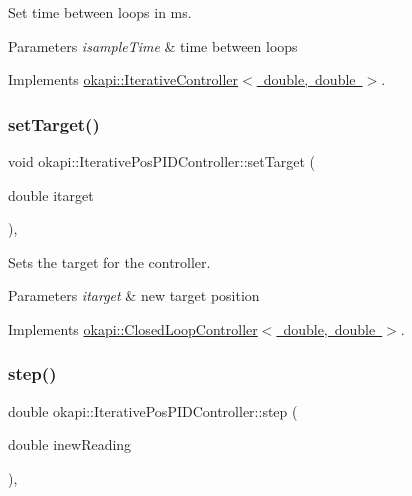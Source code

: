 Set time between loops in ms.


\begin{DoxyParams}{Parameters}
{\em isample\+Time} & time between loops \\
\hline
\end{DoxyParams}


Implements \mbox{\hyperlink{classokapi_1_1IterativeController_ac4cfb1b37a3c707b2fc8f2fbda526f3e}{okapi\+::\+Iterative\+Controller$<$ double, double $>$}}.

\mbox{\label{classokapi_1_1IterativePosPIDController_a566f7d7834eefd6b542d2e231d6219f9}} 
\subsubsection{\texorpdfstring{setTarget()}{setTarget()}}
{\footnotesize\ttfamily void okapi\+::\+Iterative\+Pos\+P\+I\+D\+Controller\+::set\+Target (\begin{DoxyParamCaption}\item[{double}]{itarget }\end{DoxyParamCaption})\hspace{0.3cm}{\ttfamily [override]}, {\ttfamily [virtual]}}

Sets the target for the controller.


\begin{DoxyParams}{Parameters}
{\em itarget} & new target position \\
\hline
\end{DoxyParams}


Implements \mbox{\hyperlink{classokapi_1_1ClosedLoopController_ac14482d0768b3f157d52e0214a4c36d7}{okapi\+::\+Closed\+Loop\+Controller$<$ double, double $>$}}.

\mbox{\label{classokapi_1_1IterativePosPIDController_acec6d9ee4c41f78b54b6b28317bcd1e9}} 
\subsubsection{\texorpdfstring{step()}{step()}}
{\footnotesize\ttfamily double okapi\+::\+Iterative\+Pos\+P\+I\+D\+Controller\+::step (\begin{DoxyParamCaption}\item[{double}]{inew\+Reading }\end{DoxyParamCaption})\hspace{0.3cm}{\ttfamily [override]}, {\ttfamily [virtual]}}

